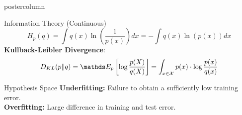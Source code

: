 \documentclass{beamer}
\begin{document}
\begin{frame}[fragile]{}
\begin{columns}
\begin{column}{.31\textwidth}
\begin{beamercolorbox}[center]{postercolumn}
\begin{minipage}{.98\textwidth}
{\begin{myblock}{Information Theory (Continuous)}
	$$ H_p(q) = \int q(x) \ln\left(\frac{1}{p(x)}\right) dx = - \int q(x) \ln\left(p(x)\right) dx $$
	\textbf{Kullback-Leibler Divergence}:
	$$ D_{KL}(p \| q) = \E_p \left[\log \frac{p(X)}{q(X)}\right] = \int_{x \in \Xspace} p(x) \cdot \log \frac{p(x)}{q(x)} $$
\end{myblock}
%
%   
\begin{myblock}{Hypothesis Space}
%
	\textbf{Underfitting:} Failure to obtain a sufficiently low training error. \\
	\textbf{Overfitting:} Large difference in training and test error.\\
	

\end{myblock}}
\end{minipage}
\end{beamercolorbox}
\end{column}
\end{columns}
\end{frame}
\end{document}
